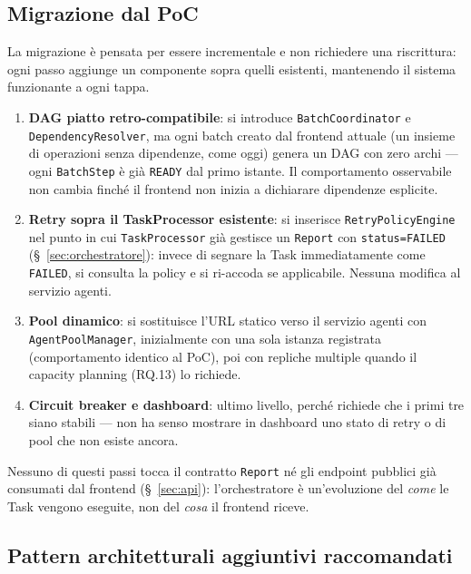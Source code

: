 \documentclass[11pt,a4paper]{article}
\begin{document}
\subsection{Migrazione dal PoC}

La migrazione è pensata per essere incrementale e non richiedere una riscrittura: ogni passo aggiunge un componente sopra quelli esistenti, mantenendo il sistema funzionante a ogni tappa.

\begin{enumerate}
    \item \textbf{DAG piatto retro-compatibile}: si introduce \texttt{BatchCoordinator} e \texttt{DependencyResolver}, ma ogni batch creato dal frontend attuale (un insieme di operazioni senza dipendenze, come oggi) genera un DAG con zero archi --- ogni \texttt{BatchStep} è già \texttt{READY} dal primo istante. Il comportamento osservabile non cambia finché il frontend non inizia a dichiarare dipendenze esplicite.
    \item \textbf{Retry sopra il TaskProcessor esistente}: si inserisce \texttt{RetryPolicyEngine} nel punto in cui \texttt{TaskProcessor} già gestisce un \texttt{Report} con \texttt{status=FAILED} (\S~\ref{sec:orchestratore}): invece di segnare la Task immediatamente come \texttt{FAILED}, si consulta la policy e si ri-accoda se applicabile. Nessuna modifica al servizio agenti.
    \item \textbf{Pool dinamico}: si sostituisce l'URL statico verso il servizio agenti con \texttt{AgentPoolManager}, inizialmente con una sola istanza registrata (comportamento identico al PoC), poi con repliche multiple quando il capacity planning (RQ.13) lo richiede.
    \item \textbf{Circuit breaker e dashboard}: ultimo livello, perché richiede che i primi tre siano stabili --- non ha senso mostrare in dashboard uno stato di retry o di pool che non esiste ancora.
\end{enumerate}

Nessuno di questi passi tocca il contratto \texttt{Report} né gli endpoint pubblici già consumati dal frontend (\S~\ref{sec:api}): l'orchestratore è un'evoluzione del \emph{come} le Task vengono eseguite, non del \emph{cosa} il frontend riceve.

\subsection{Pattern architetturali aggiuntivi raccomandati}
\label{sub:orch-pattern-aggiuntivi}
\end{document}
